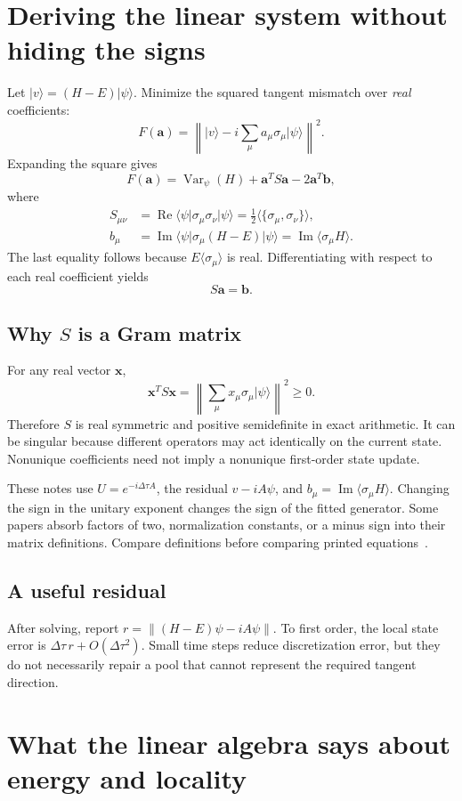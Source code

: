 \documentclass[11pt,a4paper]{article}
\newcommand{\ket}[1]{\lvert #1\rangle}
\newcommand{\bra}[1]{\langle #1\rvert}
\newcommand{\ex}[1]{\langle #1\rangle}
\newcommand{\norm}[1]{\left\lVert #1\right\rVert}
\newcommand{\Var}{\operatorname{Var}}
\newcommand{\Rea}{\operatorname{Re}}
\newcommand{\Ima}{\operatorname{Im}}
\newcommand{\dt}{\Delta\tau}
\newcommand{\lesson}[2]{\clearpage\section{#1}\label{#2}}
\begin{document}
\lesson{Deriving the linear system without hiding the signs}{sec:linear}
Let $\ket{v}=(H-E)\ket{\psi}$. Minimize the squared tangent mismatch over \emph{real} coefficients:
\[
F(\bm a)=\norm{\ket{v}-i\sum_\mu a_\mu\sigma_\mu\ket{\psi}}^2.
\]
Expanding the square gives
\[
F(\bm a)=\Var_\psi(H)+\bm a^T S\bm a-2\bm a^T\bm b,
\]
where
\begin{align}
S_{\mu\nu}&=\Rea\bra{\psi}\sigma_\mu\sigma_\nu\ket{\psi}
=\tfrac12\ex{\{\sigma_\mu,\sigma_\nu\}},\label{eq:S}\\
b_\mu&=\Ima\bra{\psi}\sigma_\mu(H-E)\ket{\psi}
=\Ima\ex{\sigma_\mu H}.\label{eq:b}
\end{align}
The last equality follows because $E\ex{\sigma_\mu}$ is real. Differentiating with respect to each real coefficient yields
\begin{equation}
\boxed{S\bm a=\bm b.}
\label{eq:solve}
\end{equation}

\subsection*{Why $S$ is a Gram matrix}
For any real vector $\bm x$,
\[
\bm x^T S\bm x=\norm{\sum_\mu x_\mu\sigma_\mu\ket{\psi}}^2\ge0.
\]
Therefore $S$ is real symmetric and positive semidefinite in exact arithmetic. It can be singular because different operators may act identically on the current state. Nonunique coefficients need not imply a nonunique first-order state update.

\begin{caution}
These notes use $U=e^{-i\dt A}$, the residual $v-iA\psi$, and $b_\mu=\Ima\ex{\sigma_\mu H}$. Changing the sign in the unitary exponent changes the sign of the fitted generator. Some papers absorb factors of two, normalization constants, or a minus sign into their matrix definitions. Compare definitions before comparing printed equations~\cite{motta}.
\end{caution}

\subsection*{A useful residual}
After solving, report $r=\norm{(H-E)\psi-iA\psi}$. To first order, the local state error is $\dt\,r+O(\dt^2)$. Small time steps reduce discretization error, but they do not necessarily repair a pool that cannot represent the required tangent direction.

\lesson{What the linear algebra says about energy and locality}{sec:matrix}
\end{document}
